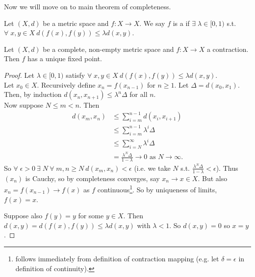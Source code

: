 Now we will move on to main theorem of completeness.

\begin{definition}
    Let $(X, d)$ be a metric space and $f:X \to X$.
    We say $f$ is a  if $\exists \; \lambda \in [0, 1)$ s.t. $\forall \; x, y \in X \ d(f(x), f(y)) \leq \lambda d(x, y)$.
\end{definition} 

\begin{theorem} \label{thm:19}
    Let $(X, d)$ be a complete, non-empty metric space and $f: X \to X$ a contraction.
    Then $f$ has a unique fixed point.
\end{theorem} 

\begin{proof}
    Let $\lambda \in [0, 1)$ satisfy $\forall \; x, y \in X \ d(f(x), f(y)) \leq \lambda d(x, y)$. \\
    Let $x_0 \in X$.
    Recursively define $x_n = f(x_{n - 1})$ for $n \geq 1$.
    Let $\Delta = d(x_0, x_1)$.
    Then, by induction $d(x_n, x_{n+1}) \leq \lambda^n \Delta$ for all $n$. \\
    Now suppose $N \leq m < n$.
    Then
    \begin{align*}
        d(x_m, x_n) &\leq \sum_{i=m}^{n-1} d(x_i, x_{i + 1}) \\
        &\leq \sum_{i=m}^{n-1} \lambda^i \Delta \\
        &\leq \sum_{i=N}^{\infty} \lambda^i \Delta \\
        &= \frac{\lambda^N \Delta}{1 - \lambda} \to 0 \text{ as $N \to \infty$}.
    \end{align*}
    So $\forall \; \epsilon > 0 \ \exists \; N \ \forall \; m, n \geq N \ d(x_m, x_n) < \epsilon$ (i.e. we take $N$ s.t. $\frac{\lambda^N \Delta}{1 - \lambda} < \epsilon$).
    Thus $(x_n)$ is Cauchy, so by completeness converges, say $x_n \to x \in X$.
    But also $x_n = f(x_{n-1}) \to f(x)$ as $f$ continuous\footnote{follows immediately from definition of contraction mapping (e.g. let $\delta = \epsilon$ in definition of continuity).}.
    So by uniqueness of limits, $f(x) = x$.

    Suppose also $f(y) = y$ for some $y \in X$.
    Then $d(x, y) = d(f(x), f(y)) \leq \lambda d(x, y)$ with $\lambda < 1$.
    So $d(x, y) = 0$ so $x = y$.
\end{proof} 

